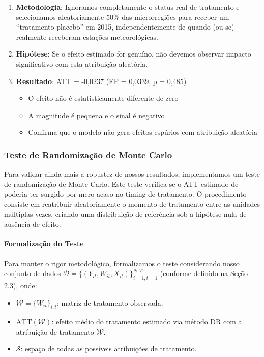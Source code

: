 \documentclass[
	12pt,				%
	oneside,			%
	a4paper,			%
	english,			%
	french,				%
	spanish,			%
	brazil				%
	]{abntex2}
\begin{document}
\begin{enumerate}
\item \textbf{Metodologia}: Ignoramos completamente o status real de tratamento e selecionamos aleatoriamente 50\% das microrregiões para receber um ``tratamento placebo'' em 2015, independentemente de quando (ou se) realmente receberam estações meteorológicas.

\item \textbf{Hipótese}: Se o efeito estimado for genuíno, não devemos observar impacto significativo com esta atribuição aleatória.

\item \textbf{Resultado}: ATT = -0,0237 (EP = 0,0339, p = 0,485)
\begin{itemize}
\item O efeito não é estatisticamente diferente de zero
\item A magnitude é pequena e o sinal é negativo
\item Confirma que o modelo não gera efeitos espúrios com atribuição aleatória
\end{itemize}
\end{enumerate}

\subsubsection{Teste de Randomização de Monte Carlo}

Para validar ainda mais a robustez de nossos resultados, implementamos um teste de randomização de Monte Carlo. Este teste verifica se o ATT estimado de \mainatt{} poderia ter surgido por mero acaso no timing de tratamento. O procedimento consiste em reatribuir aleatoriamente o momento de tratamento entre as unidades múltiplas vezes, criando uma distribuição de referência sob a hipótese nula de ausência de efeito.

\paragraph{Formalização do Teste}

Para manter o rigor metodológico, formalizamos o teste considerando nosso conjunto de dados $\mathcal{D} = \{(Y_{it}, W_{it}, X_{it})\}_{i=1,t=1}^{N,T}$ (conforme definido na Seção 2.3), onde:

\begin{itemize}
\item $\mathcal{W} = \{W_{it}\}_{i,t}$: matriz de tratamento observada.
\item $\text{ATT}(\mathcal{W})$: efeito médio do tratamento estimado via método DR com a atribuição de tratamento $\mathcal{W}$.
\item $\mathcal{S}$: espaço de todas as possíveis atribuições de tratamento.
\end{itemize}
\end{document}
